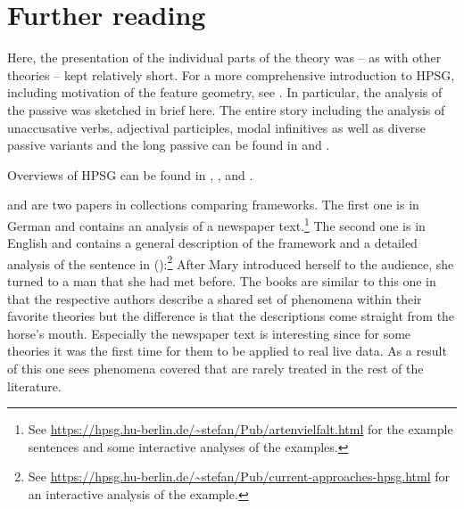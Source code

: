 \section*{Further reading}

Here, the presentation of the individual parts of the theory was -- as with other theories -- kept relatively short. For a more comprehensive
introduction to HPSG, including motivation of the feature geometry, see .\nocite{Mueller99a,Mueller2002b}
In particular, the analysis of the passive was sketched in brief here. The entire story including the analysis of unaccusative verbs, adjectival participles,
modal infinitives as well as diverse passive variants and the long passive can be found in 
 and .

Overviews of HPSG can be found in , ,  and .

 and  are two papers in collections
comparing frameworks. The first one is in German and contains an analysis of a newspaper
text.\footnote{%
  See \url{https://hpsg.hu-berlin.de/~stefan/Pub/artenvielfalt.html} for the example sentences and
  some interactive analyses of the examples.
} The
second one is in English and contains a general description of the framework and a detailed analysis
of the sentence in ():\footnote{%
  See \url{https://hpsg.hu-berlin.de/~stefan/Pub/current-approaches-hpsg.html} for an interactive
  analysis of the example.
}
\ea
\label{ex-after-mary-complete}
After Mary introduced herself to the audience, she turned to a man that she had met before.
\z
The books are similar to this one in that the respective authors describe a shared set of phenomena
within their favorite theories but the difference is that the descriptions come straight from the
horse's mouth. Especially the newspaper text is interesting since for some theories it was the first
time for them to be applied to real live data. As a result of this one sees phenomena covered that
are rarely treated in the rest of the literature.


